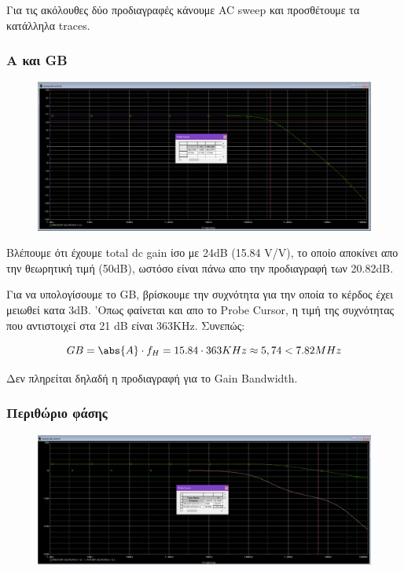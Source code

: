 \documentclass[12pt, a4paper]{article}
\begin{document}
Για τις ακόλουθες δύο προδιαγραφές κάνουμε AC sweep και προσθέτουμε τα κατάλληλα traces.

\subsubsection{A και GB}

\begin{figure}[h!]
	\centering
	\includegraphics[width = \textwidth, height = .25\textheight, keepaspectratio]{assets/gain_GB.png}
\end{figure}

Βλέπουμε ότι έχουμε total dc gain ίσο με 24dB (15.84 V/V), το οποίο αποκίνει απο την θεωρητική τιμή (50dB), ωστόσο είναι πάνω απο την προδιαγραφή των 20.82dB.

Για να υπολογίσουμε το GB, βρίσκουμε την συχνότητα για την οποία το κέρδος έχει μειωθεί κατα 3dB. 'Οπως φαίνεται και απο το Probe Cursor, η τιμή της συχνότητας που αντιστοιχεί στα 21 dB είναι 363ΚHz. Συνεπώς:

\[  GB = \abs{A} \cdot f_H = 15.84 \cdot 363KHz \approx 5,74 < 7.82 MHz \]

Δεν πληρείται δηλαδή η προδιαγραφή για το Gain Bandwidth.

\subsubsection{Περιθώριο φάσης}

\begin{figure}[h!]
	\centering
	\includegraphics[width = \textwidth, height = .25\textheight, keepaspectratio]{assets/phase_margin.png}
\end{figure}
\end{document}

